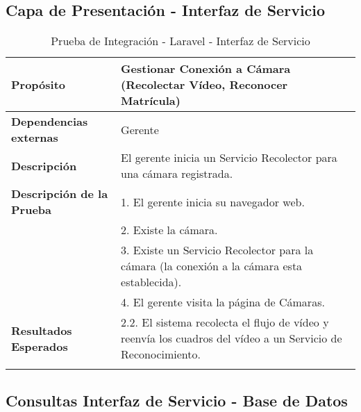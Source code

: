 \subsection{Capa de Presentación - Interfaz de Servicio}
\begin{longtable}{@{} p{3cm} p{10cm} @{}} \toprule
\textbf{Propósito}                  & Gestionar Conexión a Cámara (Recolectar Vídeo, Reconocer Matrícula) \\ \midrule
\textbf{Dependencias externas}      & Gerente \\ \cmidrule{1-2}
\textbf{Descripción}                & El gerente inicia un Servicio Recolector para una cámara registrada. \\ \cmidrule{1-2}
\textbf{Descripción de la Prueba}   & 1. El gerente inicia su navegador web. \\ 
                                    & 2. Existe la cámara. \\
                                    & 3. Existe un Servicio Recolector para la cámara (la conexión a la cámara esta establecida). \\
                                    & 4. El gerente visita la página de Cámaras.  \\ \cmidrule{1-2} 
\textbf{Resultados Esperados}       & 2.2. El sistema recolecta el flujo de vídeo y reenvía los cuadros del vídeo a un Servicio de Reconocimiento. \\ \bottomrule
\caption{Prueba de Integración - Laravel - Interfaz de Servicio} \label{tab:tabcu-rec}  \\
\end{longtable}

\pagebreak       
\subsection{Consultas Interfaz de Servicio - Base de Datos}

